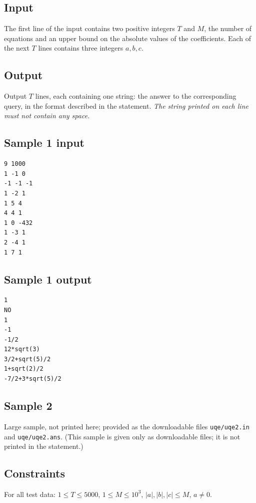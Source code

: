\documentclass[11pt]{article}
\begin{document}
\subsection*{Input}

The first line of the input contains two positive integers $T$ and $M$,
the number of equations and an upper bound on the absolute values of the
coefficients.
Each of the next $T$ lines contains three integers $a, b, c$.

\subsection*{Output}

Output $T$ lines, each containing one string: the answer to the
corresponding query, in the format described in the statement.
\emph{The string printed on each line must not contain any space.}

\subsection*{Sample 1 input}

\begin{verbatim}
9 1000
1 -1 0
-1 -1 -1
1 -2 1
1 5 4
4 4 1
1 0 -432
1 -3 1
2 -4 1
1 7 1
\end{verbatim}

\subsection*{Sample 1 output}

\begin{verbatim}
1
NO
1
-1
-1/2
12*sqrt(3)
3/2+sqrt(5)/2
1+sqrt(2)/2
-7/2+3*sqrt(5)/2
\end{verbatim}

\subsection*{Sample 2}

Large sample, not printed here;
provided as the downloadable files \texttt{uqe/uqe2.in} and \texttt{uqe/uqe2.ans}.
(This sample is given only as downloadable files; it is not printed in the
statement.)

\subsection*{Constraints}

For all test data: $1 \le T \le 5000$, $1 \le M \le 10^3$,
$|a|, |b|, |c| \le M$, $a \ne 0$.
\end{document}
